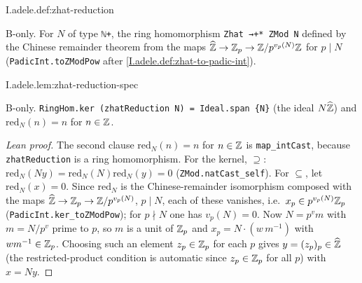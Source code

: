 \begin{definition}
\bonly
{}
\end{definition}
\begin{tfformal}{I.adele.def:zhat-reduction}
\begin{tffidelity}
B-only. For $N$ of type \texttt{ℕ+}, the ring homomorphism \texttt{Zhat →+* ZMod N} defined by the Chinese remainder theorem from the maps $\widehat{\mathbb{Z}}\to\mathbb{Z}_p\to\mathbb{Z}/p^{v_p(N)}\mathbb{Z}$ for $p\mid N$ (\texttt{PadicInt.toZModPow} after \cref{I.adele.def:zhat-to-padic-int}).
\end{tffidelity}
\end{tfformal}

\begin{lemma}
\bonly
{}
\end{lemma}
\begin{tfformal}{I.adele.lem:zhat-reduction-spec}
\begin{tffidelity}
B-only. \texttt{RingHom.ker (zhatReduction N) = Ideal.span \{N\}} (the ideal $N\widehat{\mathbb{Z}}$) and $\mathrm{red}_N(n)=n$ for $n\in\mathbb{Z}$.
\end{tffidelity}
\end{tfformal}
\begin{proof}[Lean proof]
The second clause $\mathrm{red}_N(n)=n$ for $n\in\mathbb{Z}$ is \texttt{map\_intCast}, because \texttt{zhatReduction} is a ring homomorphism. For the kernel, $\supseteq$: $\mathrm{red}_N(Ny)=\mathrm{red}_N(N)\mathrm{red}_N(y)=0$ (\texttt{ZMod.natCast\_self}). For $\subseteq$, let $\mathrm{red}_N(x)=0$. Since $\mathrm{red}_N$ is the Chinese-remainder isomorphism composed with the maps $\widehat{\mathbb{Z}}\to\mathbb{Z}_p\to\mathbb{Z}/p^{v_p(N)}$, $p\mid N$, each of these vanishes, i.e.\ $x_p\in p^{v_p(N)}\mathbb{Z}_p$ (\texttt{PadicInt.ker\_toZModPow}); for $p\nmid N$ one has $v_p(N)=0$. Now $N=p^{v}m$ with $m=N/p^v$ prime to $p$, so $m$ is a unit of $\mathbb{Z}_p$ and $x_p=N\cdot(w\,m^{-1})$ with $w m^{-1}\in\mathbb{Z}_p$. Choosing such an element $z_p\in\mathbb{Z}_p$ for each $p$ gives $y=(z_p)_p\in\widehat{\mathbb{Z}}$ (the restricted-product condition is automatic since $z_p\in\mathbb{Z}_p$ for all $p$) with $x=Ny$.
\end{proof}

